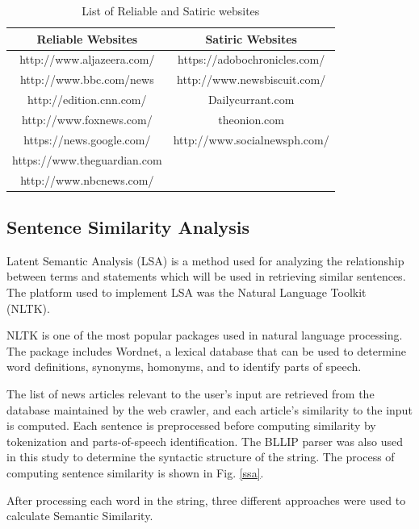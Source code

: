 \documentclass[journal]{./IEEEtran}
\begin{document}
	\begin{table}[h!]
	       \caption{List of Reliable and Satiric websites}
	    \begin{center}
    		\begin{tabular}{ |c|c| } 
    			\hline
    			Reliable Websites & Satiric Websites \\ 
    			\hline
    			http://www.aljazeera.com/ & https://adobochronicles.com/  \\ 
    			http://www.bbc.com/news & http://www.newsbiscuit.com/  \\ 
    			http://edition.cnn.com/ & Dailycurrant.com  \\ 
    			http://www.foxnews.com/ & theonion.com  \\ 
    			https://news.google.com/ & http://www.socialnewsph.com/  \\ 
    			https://www.theguardian.com  & \\ 
    			http://www.nbcnews.com/  & \\ 
    			\hline
    		\end{tabular}
    		
    		\label{tablea}
    	\end{center}	
    \end{table}	
	

	\subsection{Sentence Similarity Analysis}
	Latent Semantic Analysis (LSA) is a method used for analyzing the relationship between terms and statements which will be used in retrieving similar sentences. The platform used to implement LSA was the Natural Language Toolkit (NLTK).
	
	NLTK is one of the most popular packages used in natural language processing. The  package includes Wordnet, a lexical database that can be used to determine word definitions, synonyms, homonyms, and to identify parts of speech.
	
	The list of news articles relevant to the user's input are retrieved from the database maintained by the web crawler, and each article's similarity to the input is computed. Each sentence is preprocessed before computing similarity by tokenization and parts-of-speech identification. The BLLIP parser was also used in this study to determine the syntactic structure of the string. The process of computing sentence similarity is shown in Fig. \ref{ssa}.
	
	After processing each word in the string, three different approaches were used to calculate Semantic Similarity.
	
\end{document}

